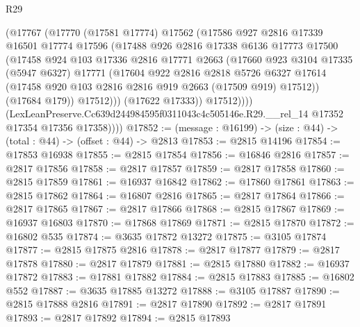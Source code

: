 \begin{lexlean}{R29}
\begin{coremodule}
                (@17767
                  (@17770
                    (@17581 @17774)
                    @17562
                    (@17586
                      @927
                      @2816
                      @17339
                      @16501
                      @17774
                      @17596
                      (@17488
                        @926
                        @2816
                        @17338
                        @6136
                        @17773
                        @17500
                        (@17458
                          @924
                          @103
                          @17336
                          @2816
                          @17771
                          @2663
                          (@17660
                            @923
                            @3104
                            @17335
                            (@5947 @6327)
                            @17771
                            (@17604
                              @922
                              @2816
                              @2818
                              @5726
                              @6327
                              @17614
                              (@17458 @920 @103 @2816 @2816 @919 @2663 (@17509 @919) @17512))
                            (@17684 @179))
                          @17512)))
                    (@17622 @17333))
                  @17512))))
          (LexLeanPreserve.Cc639d244984595f0311043c4c505146e.R29.__rel_14
            @17352
            @17354
            @17356
            @17358))))
@17852 := (message : @16199) -> (size : @44) -> (total : @44) -> (offset : @44) -> @2813
@17853 := @2815 @14196
@17854 := @17853 @16938
@17855 := @2815 @17854
@17856 := @16846 @2816
@17857 := @2817 @17856
@17858 := @2817 @17857
@17859 := @2817 @17858
@17860 := @2815 @17859
@17861 := @16937 @16842
@17862 := @17860 @17861
@17863 := @2815 @17862
@17864 := @16807 @2816
@17865 := @2817 @17864
@17866 := @2817 @17865
@17867 := @2817 @17866
@17868 := @2815 @17867
@17869 := @16937 @16803
@17870 := @17868 @17869
@17871 := @2815 @17870
@17872 := @16802 @535
@17874 := @3635 @17872 @13272
@17875 := @3105 @17874
@17877 := @2815 @17875 @2816
@17878 := @2817 @17877
@17879 := @2817 @17878
@17880 := @2817 @17879
@17881 := @2815 @17880
@17882 := @16937 @17872
@17883 := @17881 @17882
@17884 := @2815 @17883
@17885 := @16802 @552
@17887 := @3635 @17885 @13272
@17888 := @3105 @17887
@17890 := @2815 @17888 @2816
@17891 := @2817 @17890
@17892 := @2817 @17891
@17893 := @2817 @17892
@17894 := @2815 @17893

\end{coremodule}
\end{lexlean}
